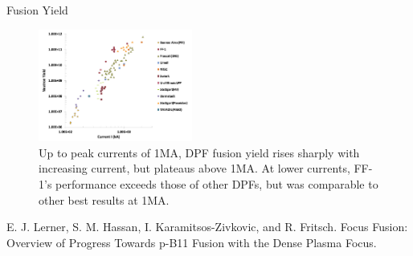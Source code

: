 \begin{frame} {Fusion Yield}
    \begin{figure}
        \centering
        \includegraphics[width=0.45\textwidth]{figures/fusion-yield.png}
        \caption{Up to peak currents of 1MA, DPF fusion yield rises sharply with increasing current, but plateaus above 1MA. At lower currents, FF-1's performance exceeds those of other DPFs, but was comparable to other best results at 1MA. \cite{lerner_2023_focus}}
        \label{fig:fusion-yield}
    \end{figure}

    E. J. Lerner, S. M. Hassan, I. Karamitsos-Zivkovic, and R. Fritsch. Focus Fusion: Overview of Progress Towards p-B11 Fusion with the Dense Plasma Focus.
\end{frame}